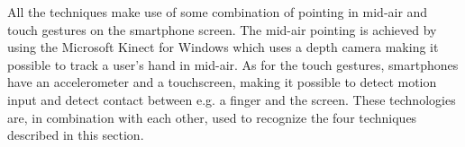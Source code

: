 All the techniques make use of some combination of pointing in mid-air and touch gestures on the smartphone screen.
The mid-air pointing is achieved by using the Microsoft Kinect for Windows which uses a depth camera making it possible to track a user's hand in mid-air.
As for the touch gestures, smartphones have an accelerometer and a touchscreen, making it possible to detect motion input and detect contact between e.g. a finger and the screen.
These technologies are, in combination with each other, used to recognize the four techniques described in this section. 